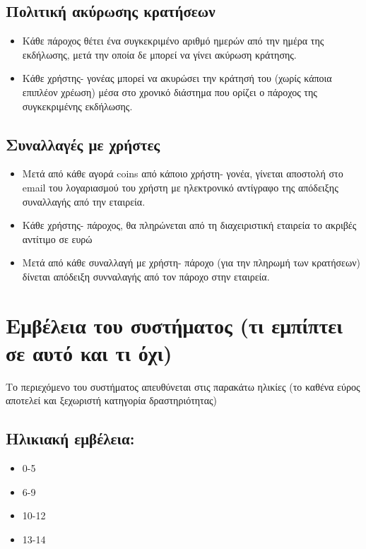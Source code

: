 \documentclass[letterpaper,6pt]{article}
\begin{document}
\subsection{Πολιτική ακύρωσης κρατήσεων}
\begin{itemize}
  \item Κάθε πάροχος θέτει ένα συγκεκριμένο αριθμό ημερών από την ημέρα της εκδήλωσης, μετά την οποία δε μπορεί να γίνει ακύρωση κράτησης.
  \item Κάθε χρήστης- γονέας μπορεί να ακυρώσει την κράτησή του (χωρίς κάποια επιπλέον χρέωση) μέσα στο χρονικό διάστημα που ορίζει ο πάροχος της συγκεκριμένης εκδήλωσης.
\end{itemize}

\subsection{Συναλλαγές με χρήστες}
\begin{itemize}
  \item Μετά από κάθε αγορά coins από κάποιο χρήστη- γονέα, γίνεται αποστολή στο email του λογαριασμού του χρήστη με ηλεκτρονικό αντίγραφο της απόδειξης συναλλαγής από την εταιρεία.
  \item Κάθε χρήστης- πάροχος, θα πληρώνεται από τη διαχειριστική εταιρεία το ακριβές αντίτιμο σε ευρώ
  \item Μετά από κάθε συναλλαγή με χρήστη- πάροχο (για την πληρωμή των κρατήσεων) δίνεται απόδειξη συνναλαγής από τον πάροχο στην εταιρεία.
\end{itemize}


\section{Εμβέλεια του συστήματος (τι εμπίπτει σε αυτό και τι όχι)}
Το περιεχόμενο του συστήματος απευθύνεται στις παρακάτω ηλικίες (το καθένα εύρος αποτελεί και ξεχωριστή κατηγορία δραστηριότητας)
\subsection{Ηλικιακή εμβέλεια:}
\begin{itemize}
  \item 0-5
  \item 6-9
  \item 10-12
  \item 13-14
\end{itemize}
\end{document}
